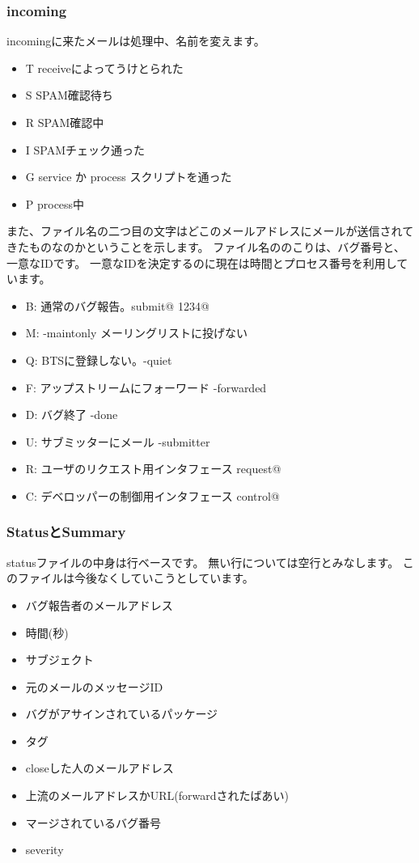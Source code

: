 \documentclass[mingoth,a4paper]{jsarticle}
\begin{document}
\subsubsection{incoming}

incomingに来たメールは処理中、名前を変えます。

\begin{itemize}
 \item T receiveによってうけとられた
 \item S SPAM確認待ち
 \item R SPAM確認中
 \item I SPAMチェック通った
 \item G service か process スクリプトを通った
 \item P process中
\end{itemize}

また、ファイル名の二つ目の文字はどこのメールアドレスにメールが送信されて
きたものなのかということを示します。
ファイル名ののこりは、バグ番号と、一意なIDです。
一意なIDを決定するのに現在は時間とプロセス番号を利用しています。

\begin{itemize}
 \item B: 通常のバグ報告。submit@ 1234@
 \item M: -maintonly メーリングリストに投げない
 \item Q: BTSに登録しない。-quiet
 \item F: アップストリームにフォーワード -forwarded
 \item D: バグ終了 -done
 \item U: サブミッターにメール -submitter
 \item R: ユーザのリクエスト用インタフェース request@
 \item C: デベロッパーの制御用インタフェース control@
\end{itemize}

\subsubsection{StatusとSummary}

statusファイルの中身は行ベースです。
無い行については空行とみなします。
このファイルは今後なくしていこうとしています。

\begin{itemize}
 \item バグ報告者のメールアドレス
 \item 時間(秒)
 \item サブジェクト
 \item 元のメールのメッセージID
 \item バグがアサインされているパッケージ
 \item タグ
 \item closeした人のメールアドレス
 \item 上流のメールアドレスかURL(forwardされたばあい)
 \item マージされているバグ番号
 \item severity
\end{itemize}
\end{document}
